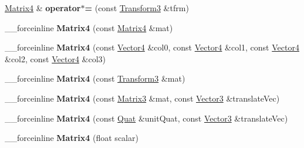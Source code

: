 \begin{DoxyCompactItemize}
\item 
\hypertarget{classVectormath_1_1Aos_1_1Matrix4_afab4864e33c43c4e610b2ed1041c49be}{\hyperlink{classVectormath_1_1Aos_1_1Matrix4}{Matrix4} \& {\bfseries operator$\ast$=} (const \hyperlink{classVectormath_1_1Aos_1_1Transform3}{Transform3} \&tfrm)}\label{classVectormath_1_1Aos_1_1Matrix4_afab4864e33c43c4e610b2ed1041c49be}

\item 
\hypertarget{classVectormath_1_1Aos_1_1Matrix4_a494b758b1cc4eadbfe225a37cf49fc02}{\-\_\-\-\_\-forceinline {\bfseries Matrix4} (const \hyperlink{classVectormath_1_1Aos_1_1Matrix4}{Matrix4} \&mat)}\label{classVectormath_1_1Aos_1_1Matrix4_a494b758b1cc4eadbfe225a37cf49fc02}

\item 
\hypertarget{classVectormath_1_1Aos_1_1Matrix4_a681dec8c41b89e5f5bff0f58508cb317}{\-\_\-\-\_\-forceinline {\bfseries Matrix4} (const \hyperlink{classVectormath_1_1Aos_1_1Vector4}{Vector4} \&col0, const \hyperlink{classVectormath_1_1Aos_1_1Vector4}{Vector4} \&col1, const \hyperlink{classVectormath_1_1Aos_1_1Vector4}{Vector4} \&col2, const \hyperlink{classVectormath_1_1Aos_1_1Vector4}{Vector4} \&col3)}\label{classVectormath_1_1Aos_1_1Matrix4_a681dec8c41b89e5f5bff0f58508cb317}

\item 
\hypertarget{classVectormath_1_1Aos_1_1Matrix4_aaef89fdf6ff83ab59d0037bce9c01423}{\-\_\-\-\_\-forceinline {\bfseries Matrix4} (const \hyperlink{classVectormath_1_1Aos_1_1Transform3}{Transform3} \&mat)}\label{classVectormath_1_1Aos_1_1Matrix4_aaef89fdf6ff83ab59d0037bce9c01423}

\item 
\hypertarget{classVectormath_1_1Aos_1_1Matrix4_a02d81c98c918ca0a4e10f23811528e85}{\-\_\-\-\_\-forceinline {\bfseries Matrix4} (const \hyperlink{classVectormath_1_1Aos_1_1Matrix3}{Matrix3} \&mat, const \hyperlink{classVectormath_1_1Aos_1_1Vector3}{Vector3} \&translate\-Vec)}\label{classVectormath_1_1Aos_1_1Matrix4_a02d81c98c918ca0a4e10f23811528e85}

\item 
\hypertarget{classVectormath_1_1Aos_1_1Matrix4_a658f2058d620e1cb1cce86505f43d231}{\-\_\-\-\_\-forceinline {\bfseries Matrix4} (const \hyperlink{classVectormath_1_1Aos_1_1Quat}{Quat} \&unit\-Quat, const \hyperlink{classVectormath_1_1Aos_1_1Vector3}{Vector3} \&translate\-Vec)}\label{classVectormath_1_1Aos_1_1Matrix4_a658f2058d620e1cb1cce86505f43d231}

\item 
\hypertarget{classVectormath_1_1Aos_1_1Matrix4_af37bda3eea7c05f8bce66dbd35e2ed60}{\-\_\-\-\_\-forceinline {\bfseries Matrix4} (float scalar)}\label{classVectormath_1_1Aos_1_1Matrix4_af37bda3eea7c05f8bce66dbd35e2ed60}


\end{DoxyCompactItemize}
